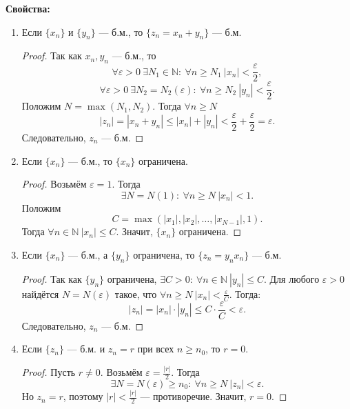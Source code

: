 \textbf{Свойства:}

\begin{enumerate}
\item Если \(\{x_n\}\) и \(\{y_n\}\) --- б.м., то \(\{z_n = x_n + y_n\}\) --- б.м.

\begin{proof}
Так как \(x_n, y_n\) --- б.м., то
\[
\forall \varepsilon>0\ \exists N_1\in\mathbb{N}:\ \forall n\ge N_1\
|x_n|<\frac{\varepsilon}{2},
\]
\[
\forall \varepsilon>0\ \exists N_2=N_2(\varepsilon):\ \forall n\ge N_2\
|y_n|<\frac{\varepsilon}{2}.
\]
Положим \(N=\max(N_1,N_2)\). Тогда \(\forall n\ge N\)
\[
|z_n|=|x_n+y_n|\le |x_n|+|y_n|<\frac{\varepsilon}{2} +
\frac{\varepsilon}{2}=\varepsilon.
\]
Следовательно, \(z_n\) --- б.м.

\end{proof}

\item Если \(\{x_n\}\) --- б.м., то \(\{x_n\}\) ограничена.

\begin{proof} Возьмём \(\varepsilon=1\). Тогда
\[
\exists N=N(1):\ \forall n\ge N\ |x_n|<1.
\]
Положим
\[
C=\max(|x_1|,|x_2|,\ldots,|x_{N-1}|,1).
\]
Тогда \(\forall n\in\mathbb{N}\ |x_n|\le C\). Значит, \(\{x_n\}\) ограничена.

\end{proof}

\item Если \(\{x_n\}\) --- б.м., а \(\{y_n\}\) ограничена, то \(\{z_n=y_n x_n\}\)
--- б.м.

\begin{proof} Так как \(\{y_n\}\) ограничена, \(\exists C>0:\ \forall
n \in\mathbb{N}\ |y_n|\le C\). Для любого \(\varepsilon>0\) найдётся
\(N=N(\varepsilon)\) такое, что \(\forall n\ge N\ |x_n|<\frac{\varepsilon}{C}\).
Тогда:
\[
|z_n|=|x_n|\cdot|y_n|\le C\cdot\frac{\varepsilon}{C}<\varepsilon.
\]
Следовательно, \(z_n\) --- б.м.

\end{proof}

\item Если \(\{z_n\}\) --- б.м. и \(z_n=r\) при всех \(n\ge n_0\), то \(r=0\).

\begin{proof} Пусть \(r\ne 0\). Возьмём \(\varepsilon=\frac{|r|}{2}\). Тогда
\[
\exists N=N(\varepsilon)\ge n_0:\ \forall n\ge N\ |z_n|<\varepsilon.
\]
Но \(z_n=r\), поэтому \(|r|<\frac{|r|}{2}\) --- противоречие. Значит, \(r=0\).
\end{proof}


\end{enumerate}
